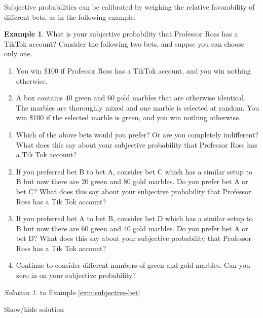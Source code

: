 \documentclass[
]{book}
\providecommand{\tightlist}{%
  \setlength{\itemsep}{0pt}\setlength{\parskip}{0pt}}
\theoremstyle{definition}
\theoremstyle{definition}
\newtheorem{example}{Example}[chapter]
\theoremstyle{definition}
\theoremstyle{remark}
\newtheorem*{solution}{Solution}
\begin{document}
Subjective probabilities can be calibrated by weighing the relative favorability of different bets, as in the following example.

\begin{example}
\protect\hypertarget{exm:subjective-bet}{}{\label{exm:subjective-bet} }
What is your subjective probability that Professor Ross has a TikTok account? Consider the following two bets, and suppse you can choose only one.

\begin{enumerate}
\def\labelenumi{\Alph{enumi})}
\tightlist
\item
  You win \$100 if Professor Ross has a TikTok account, and you win nothing otherwise.
\item
  A box contains 40 green and 60 gold marbles that are otherwise identical. The marbles are thoroughly mixed and one marble is selected at random. You win \$100 if the selected marble is green, and you win nothing otherwise.
\end{enumerate}

\begin{enumerate}
\def\labelenumi{\arabic{enumi}.}
\tightlist
\item
  Which of the above bets would you prefer? Or are you completely indifferent? What does this say about your subjective probability that Professor Ross has a Tik Tok account?
\item
  If you preferred bet B to bet A, consider bet C which has a similar setup to B but now there are 20 green and 80 gold marbles. Do you prefer bet A or bet C? What does this say about your subjective probability that Professor Ross has a Tik Tok account?
\item
  If you preferred bet A to bet B, consider bet D which has a similar setup to B but now there are 60 green and 40 gold marbles. Do you prefer bet A or bet D? What does this say about your subjective probability that Professor Ross has a Tik Tok account?
\item
  Continue to consider different numbers of green and gold marbles. Can you zero in on your subjective probability?
\end{enumerate}
\end{example}

\begin{solution}
{}
to Example \ref{exm:subjective-bet}
\end{solution}

Show/hide solution
\end{document}
